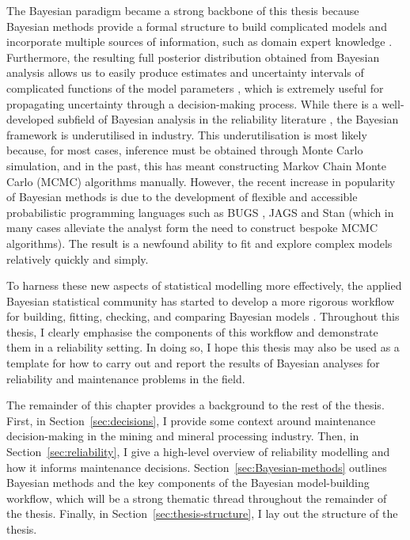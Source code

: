 The Bayesian paradigm became a strong backbone of this thesis because Bayesian methods provide a formal structure to build complicated models and incorporate multiple sources of information, such as domain expert knowledge \citep{Meeker2022}. Furthermore, the resulting full posterior distribution obtained from Bayesian analysis allows us to easily produce estimates and uncertainty intervals of complicated functions of the model parameters \citep{Meeker2022}, which is extremely useful for propagating uncertainty through a decision-making process. While there is a well-developed subfield of Bayesian analysis in the reliability literature \citep{hamada2008, Meeker2022}, the Bayesian framework is underutilised in industry. This underutilisation is most likely because, for most cases, inference must be obtained through Monte Carlo simulation, and in the past, this has meant constructing Markov Chain Monte Carlo (MCMC) algorithms manually. However, the recent increase in popularity of Bayesian methods is due to the development of flexible and accessible probabilistic programming languages such as BUGS \citep{lunn2012}, JAGS \citep{plummer2003} and Stan \citep{Stan2022} (which in many cases alleviate the analyst form the need to construct bespoke MCMC algorithms). The result is a newfound ability to fit and explore complex models relatively quickly and simply.

To harness these new aspects of statistical modelling more effectively, the applied Bayesian statistical community has started to develop a more rigorous workflow for building, fitting, checking, and comparing Bayesian models \citep{gelman_workflow_2020}. Throughout this thesis, I clearly emphasise the components of this workflow and demonstrate them in a reliability setting. In doing so, I hope this thesis may also be used as a template for how to carry out and report the results of Bayesian analyses for reliability and maintenance problems in the field.

The remainder of this chapter provides a background to the rest of the thesis. First, in Section~\ref{sec:decisions}, I provide some context around maintenance decision-making in the mining and mineral processing industry. Then, in Section~\ref{sec:reliability}, I give a high-level overview of reliability modelling and how it informs maintenance decisions. Section~\ref{sec:Bayesian-methods} outlines Bayesian methods and the key components of the Bayesian model-building workflow, which will be a strong thematic thread throughout the remainder of the thesis. Finally, in Section~\ref{sec:thesis-structure}, I lay out the structure of the thesis.

